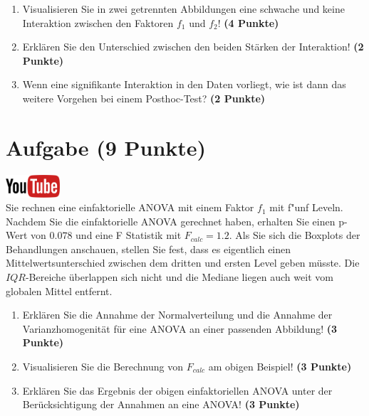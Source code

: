 \documentclass[a4paper, 9pt]{scrartcl}\usepackage[]{graphicx}\usepackage[]{xcolor}
\begin{document}
\begin{enumerate}
\item Visualisieren Sie in zwei getrennten Abbildungen 
  eine schwache und keine Interaktion zwischen
  den Faktoren $f_1$ und $f_2$! \textbf{(4 Punkte)}
\item Erkl{\"a}ren Sie den Unterschied zwischen den beiden St{\"a}rken der Interaktion!
  \textbf{(2 Punkte)}
\item Wenn eine signifikante Interaktion in den Daten vorliegt, wie ist
  dann das weitere Vorgehen bei einem Posthoc-Test? 
  \textbf{(2 Punkte)}
\end{enumerate}

 
\clearpage

\section{Aufgabe \hfill (9 Punkte)}

\hfill\href{https://youtu.be/M9Uhm67ndxM}{\includegraphics[width =
  2cm]{img/youtube}}\\[1Ex]




Sie rechnen eine einfaktorielle ANOVA mit einem Faktor $f_1$ mit
f{"u}nf Leveln. Nachdem Sie die einfaktorielle ANOVA gerechnet
haben, erhalten Sie einen p-Wert von $0.078$ und eine F Statistik mit
$F_{calc} = 1.2$. Als Sie sich die Boxplots der Behandlungen anschauen,
stellen Sie fest, dass es eigentlich einen Mittelwertsunterschied zwischen
dem dritten und ersten Level geben m{\"u}sste. Die
$IQR$-Bereiche {\"u}berlappen sich nicht und die Mediane liegen auch weit vom
globalen Mittel entfernt.


\begin{enumerate}
\item Erkl{\"a}ren Sie die Annahme der Normalverteilung und die Annahme der
  Varianzhomogenit{\"a}t f{\"u}r eine ANOVA an einer passenden Abbildung! \textbf{(3 Punkte)}
\item Visualisieren Sie die Berechnung von $F_{calc}$ am obigen Beispiel!
  \textbf{(3 Punkte)}
\item Erkl{\"a}ren Sie das Ergebnis der obigen einfaktoriellen ANOVA unter der
  Ber{\"u}cksichtigung der Annahmen an eine ANOVA! \textbf{(3 Punkte)}
\end{enumerate}
\end{document}
